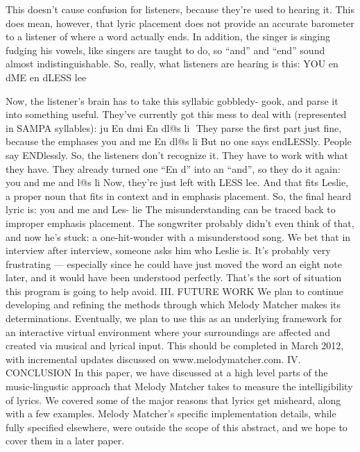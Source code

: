 \documentclass[10pt,oneside]{memoir}
\def\mybibliostyle{plain}
\def\bibliocommand{}
\begin{document}
This doesn't cause confusion for listeners, because they're used to hearing it. This does mean, however, that lyric placement does not provide an accurate barometer to a listener of where a word actually ends.
In addition, the singer is singing fudging his vowels, like singers are taught to do, so ``and'' and ``end'' sound almost indistinguishable. So, really, what listeners are hearing is this:
YOU en dME en dLESS lee


Now, the listener's brain has to take this syllabic gobbledy- gook, and parse it into something useful. They've currently got this mess to deal with (represented in SAMPA syllables):
ju En dmi En dl@s li
 They parse the first part just fine, because the emphases
you and me En dl@s li
But no one says endLESSly. People say ENDlessly. So, the listeners don't recognize it. They have to work with what they have. They already turned one ``En d'' into an ``and'', so they do it again:
you and me and l@s li
Now, they're just left with LESS lee. And that fits Leslie, a proper noun that fits in context and in emphasis placement. So, the final heard lyric is:
you and me and Les- lie
The misunderstanding can be traced back to improper emphasis placement. The songwriter probably didn't even think of that, and now he's stuck: a one-hit-wonder with a misunderstood song. We bet that in interview after interview, someone asks him who Leslie is. It's probably very frustrating --- especially since he could have just moved the word an eight note later, and it would have been understood perfectly.
That's the sort of situation this program is going to help avoid.
III. FUTURE WORK
We plan to continue developing and refining the methods through which Melody Matcher makes its determinations. Eventually, we plan to use this as an underlying framework for an interactive virtual environment where your surroundings are affected and created via musical and lyrical input. This should be completed in March 2012, with incremental updates discussed on www.melodymatcher.com.
IV. CONCLUSION
In this paper, we have discussed at a high level parts of the music-lingustic approach that Melody Matcher takes to measure the intelligibility of lyrics. We covered some of the major reasons that lyrics get misheard, along with a few examples. Melody Matcher's specific implementation details, while fully specified elsewhere, were outside the scope of this abstract, and we hope to cover them in a later paper.


%
%

\backmatter


\bibliocommand

\printglossary


\printindex
\end{document}
